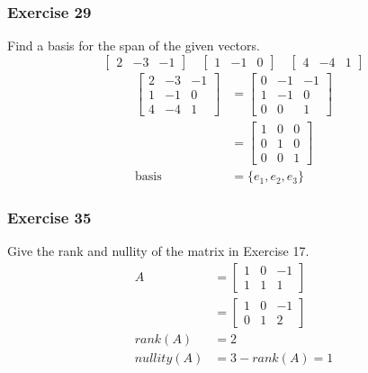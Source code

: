 \documentclass{math}
\begin{document}
\subsubsection*{Exercise 29}
Find a basis for the span of the given vectors.
\[ \begin{bmatrix}2 & -3 & -1\end{bmatrix}\quad
  \begin{bmatrix}1 & -1 & 0\end{bmatrix}\quad
  \begin{bmatrix}4 & -4 & 1\end{bmatrix} \]
\begin{align*}
  \begin{bmatrix}
    2 & -3 & -1 \\
    1 & -1 & 0 \\
    4 & -4 & 1
  \end{bmatrix} &= \begin{bmatrix}
    0 & -1 & -1 \\
    1 & -1 & 0 \\
    0 & 0 & 1
  \end{bmatrix} \\
  &= \begin{bmatrix}
    1 & 0 & 0 \\
    0 & 1 & 0 \\
    0 & 0 & 1
  \end{bmatrix} \\
  \text{basis} &= \{e_1,e_2,e_3\}
\end{align*}

\subsubsection*{Exercise 35}
Give the rank and nullity of the matrix in Exercise 17.
\begin{align*}
  A &= \begin{bmatrix}1 & 0 & -1 \\ 1 & 1 & 1\end{bmatrix} \\
  &= \begin{bmatrix}1 & 0 & -1 \\ 0 & 1 & 2\end{bmatrix} \\
  rank(A) &= 2 \\
  nullity(A) &= 3-rank(A) = 1
\end{align*}
\end{document}
